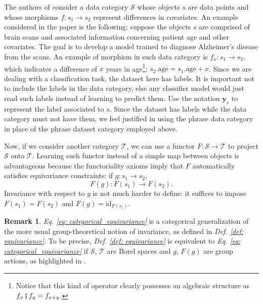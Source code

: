\documentclass[11pt,a4paper,openright,twoside]{report}
\newcounter{mycounter}
\theoremstyle{plain}
\theoremstyle{definition}
\newtheorem{remark}[mycounter]{Remark}
\begin{document}
The authors of \cite{chytas2024poolingimagedatasetsmultiple} consider a data category $\mathcal{S}$ whose objects $s$ are data points and whose morphisms $f: s_1 \to s_2$ represent differences in covariates. An example considered in the paper is the following: suppose the objects $s$ are comprised of brain scans and associated information concerning patient age and other covariates. The goal is to develop a model trained to diagnose Alzheimer's disease from the scans. An example of morphism in such data category is $f_x: s_1 \to s_2$, which indicates a difference of $x$ years in age\footnote{Notice that this kind of operator clearly possesses an algebraic structure as $f_x \fatsemi f_y = f_{x+y}$.}: $s_2.\mathrm{age} = s_1.\mathrm{age} + x$. Since we are dealing with a classification task, the dataset here has labels. It is important not to include the labels in the data category, else any classifier model would just read such labels instead of learning to predict them. Use the notation $\mathbf{y}_s$ to represent the label associated to $s$. Since the dataset has labels while the data category must not have them, we feel justified in using the phrase data category in place of the phrase dataset category employed above.

Now, if we consider another category $\mathcal{T}$, we can use a functor $F: \mathcal{S} \to \mathcal{T}$ to project $\mathcal{S}$ onto $\mathcal{T}$. Learning such functor instead of a simple map between objects is advantageous because the functoriality axioms imply that $F$ automatically satisfies equivariance constraints: if $g: s_1 \to s_2$,
\begin{equation}
  \label{eq: categorical_equivariance}
  F(g): F(s_1) \to F(s_2).
\end{equation}
Invariance with respect to $g$ is not much harder to define: it suffices to impose $F(s_1) = F(s_2)$ and $F(g) = \mathrm{id}_{F(s_1)}$.

\begin{remark}
  \textit{Eq. \ref{eq: categorical_equivariance}} is a categorical generalization of the more usual group-theoretical notion of invariance, as defined in \textit{Def. \ref{def: equivariance}}. To be precise, \textit{Def. \ref{def: equivariance}} is equivalent to \textit{Eq. \ref{eq: categorical_equivariance}} if $\mathcal{S}$, $\mathcal{T}$ are Borel spaces and $g$, $F(g)$ are group actions, as highlighted in \cite{chytas2024poolingimagedatasetsmultiple}.
\end{remark}
\end{document}
